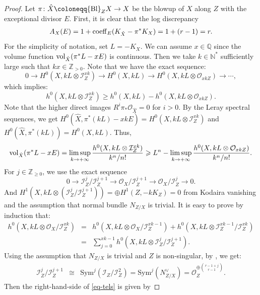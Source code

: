 \documentclass[12pt]{amsart}
\theoremstyle{definition}
\def\limsup{{\rm lim\,sup}}
\def\bl{{\rm Bl}}
\def\vol{{\rm vol}}
\def\coeff{{\rm coeff}}
\newcommand{\IN}{{\mathbb N}}
\newcommand{\IQ}{{\mathbb Q}}
\newcommand{\IZ}{{\mathbb Z}}
\newcommand{\CI}{{\mathcal I}}
\newcommand{\CO}{{\mathcal O}}
\newcommand{\gee}{\geqslant}
\begin{document}
\begin{proof}
    Let $\pi\colon \hat{X}\coloneqq\bl_Z X \rightarrow X$ be the blowup of $X$ along $Z$ with the exceptional divisor $E$. First, it is clear that the log discrepancy 
    \begin{eqnarray*}
       A_X(E) = 1+ \coeff_{E}(K_{\hat{X}}-\pi^*K_X) = 1+(r-1) = r. 
    \end{eqnarray*}
    For the simplicity of notation, set $L=-K_X$. We can assume $x\in \IQ$ since the volume function $\vol_{\hat{X}}(\pi^*L-xE)$ is continuous. Then we take $k\in \IN^*$ sufficiently large such that $kx\in \IZ_{>0}$. Note that we have the exact sequence:
$$
0\rightarrow H^0(X, kL\otimes \CI_{Z}^{xk})\rightarrow H^0(X, kL)\rightarrow H^0(X, kL\otimes \CO_{xkZ})\rightarrow \cdots,
$$
which implies:
$$
h^0(X,kL\otimes \CI_Z^{xk})\gee h^0(X,kL)-h^0(X,kL\otimes \CO_{xkZ}).
$$
Note that the higher direct images $R^i\pi_*\CO_{\hat{X}}=0$ for $i>0$. By the Leray spectral sequences, we get $H^0(\hat{X},\pi^*(kL)-xkE)=H^0(X,kL\otimes \CI_Z^{xk})$ and $H^0(\hat{X},\pi^*(kL))=H^0(X,kL)$. Thus,
$$\vol_{\hat{X}}(\pi^*L-xE) = \mathop{\limsup}_{k\rightarrow +\infty} \frac{h^0(X,kL\otimes \CI_{Z}^{xk})}{k^n/n!}\gee L^n-\mathop{\limsup}_{k\rightarrow+\infty} \frac{h^0(X, kL\otimes \CO_{xkZ})}{k^n/n!}.$$
For  $j\in \IZ_{\gee 0}$, we use the exact sequence
$$
0\rightarrow \CI_Z^{j}/\CI_Z^{j+1}\rightarrow \CO_X/\CI_Z^{j+1}\rightarrow \CO_X/\CI_Z^{j} \rightarrow 0.
$$
And $H^1(X,kL\otimes (\CI_Z^{j}/\CI_Z^{j+1}))=\oplus H^1(Z, -kK_Z)=0$ from Kodaira vanishing and the assumption that normal bundle $N_{Z/X}$ is trivial. It is easy to prove by induction that:
\begin{eqnarray} \label{eq-tels}
h^0(X, kL\otimes \CO_X/\CI_Z^{xk})&=& h^0(X, kL\otimes \CO_X/\CI_Z^{xk-1})+h^0(X, kL\otimes \CI_Z^{xk-1}/\CI^{xk}_Z) \nonumber \\
&=&\sum_{j=0}^{xk-1}h^0(X, kL\otimes \CI_Z^j/\CI^{j+1}_Z). \label{eq-tels}
\end{eqnarray}
Using the assumption that $N_{Z/X}$ is trivial and  $Z$ is non-singular, by \cite[Thm \rm II. 8.24]{Har77}, we get:
\begin{eqnarray*}
    \CI_Z^{j}/\CI_Z^{j+1}&\cong&\mathrm{Sym}^j(\CI_Z/\CI_Z^2)=\mathrm{Sym}^j(N_{Z/X}^{\vee})=\CO_Z^{\oplus \binom{r-1+j}{r-1}}. 
\end{eqnarray*}
Then the right-hand-side of \eqref{eq-tels} is given by

\end{proof}
\end{document}

